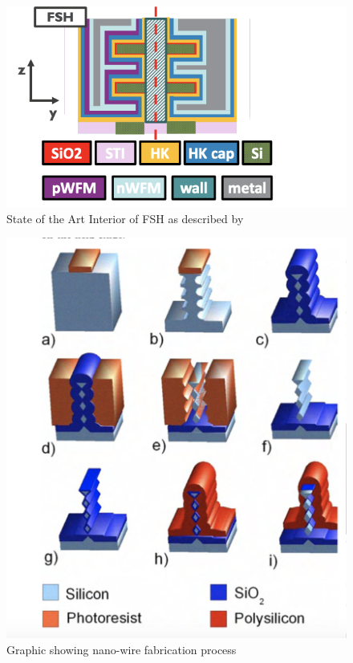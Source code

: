 \documentclass[letterpaper, 12 pt, conference]{ieeeconf}  %
\begin{document}
\begin{figure}[H]
    \centering
    \includegraphics[width=.9\linewidth]{Screen Shot 2022-02-26 at 10.04.03 PM.png}
    \caption{State of the Art Interior of FSH as described by \cite{c6} }
    \label{fig:knngraph1}
\end{figure}


\begin{figure}[H]
    \centering
    \includegraphics[width=.9\linewidth]{Screen Shot 2022-03-03 at 3.29.17 PM.png}
    \caption{Graphic showing nano-wire fabrication process}
    \label{fig:knngraph1}
\end{figure}
\end{document}
